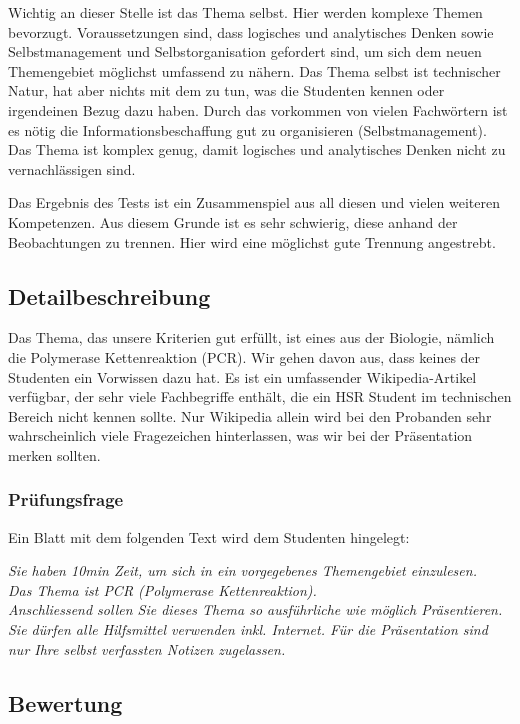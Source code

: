 Wichtig an dieser Stelle ist das Thema selbst. Hier werden komplexe Themen bevorzugt. Voraussetzungen sind, dass logisches und analytisches Denken sowie Selbstmanagement und Selbstorganisation gefordert sind, um sich dem neuen Themengebiet möglichst umfassend zu nähern. Das Thema selbst ist technischer Natur, hat aber nichts mit dem zu tun, was die Studenten kennen oder irgendeinen Bezug dazu haben. Durch das vorkommen von vielen Fachwörtern ist es nötig die Informationsbeschaffung gut zu organisieren (Selbstmanagement). Das Thema ist komplex genug, damit logisches und analytisches Denken nicht zu vernachlässigen sind.

Das Ergebnis des Tests ist ein Zusammenspiel aus all diesen und vielen weiteren Kompetenzen. Aus diesem Grunde ist es sehr schwierig, diese anhand der Beobachtungen zu trennen. Hier wird eine möglichst gute Trennung angestrebt.

\subsection{Detailbeschreibung}

Das Thema, das unsere Kriterien gut erfüllt, ist eines aus der Biologie, nämlich die Polymerase Kettenreaktion (PCR). Wir gehen davon aus, dass keines der Studenten ein Vorwissen dazu hat. Es ist ein umfassender Wikipedia-Artikel verfügbar, der sehr viele Fachbegriffe enthält, die ein HSR Student im technischen Bereich nicht kennen sollte. Nur Wikipedia allein wird bei den Probanden sehr wahrscheinlich viele Fragezeichen hinterlassen, was wir bei der Präsentation merken sollten. 

\subsubsection{Prüfungsfrage}
Ein Blatt mit dem folgenden Text wird dem Studenten hingelegt:

\textit{Sie haben 10min Zeit, um sich in ein vorgegebenes Themengebiet einzulesen. \\\vspace*{2mm}
Das Thema ist PCR (Polymerase Kettenreaktion). \\
Anschliessend sollen Sie dieses Thema so ausführliche wie möglich Präsentieren. Sie dürfen alle Hilfsmittel verwenden inkl. Internet. Für die Präsentation sind nur Ihre selbst verfassten Notizen zugelassen.}
\subsection{Bewertung}

